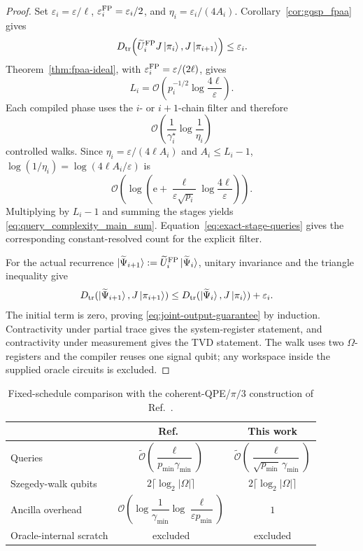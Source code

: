 \documentclass[10pt,conference]{IEEEtran}
\theoremstyle{plain}
\theoremstyle{remark}
\begin{document}
\begin{proof}
Set \(\varepsilon_i=\varepsilon/\ell\),
\(\varepsilon_i^{\rm FP}=\varepsilon_i/2\), and
\(\eta_i=\varepsilon_i/(4A_i)\).
Corollary~\ref{cor:gqsp_fpaa} gives
\[
D_{\rm tr}\!\left(
\widetilde U_i^{\rm FP}J\ket{\pi_i},J\ket{\pi_{i+1}}\right)
\leq\varepsilon_i .
\]
Theorem~\ref{thm:fpaa-ideal}, with
\(\varepsilon_i^{\rm FP}=\varepsilon/(2\ell)\), gives
\[
L_i=\mathcal O\!\left(
p_i^{-1/2}\log\frac{4\ell}{\varepsilon}\right).
\]
Each compiled phase uses the \(i\)- or \(i+1\)-chain filter and
therefore
\[
\mathcal O\!\left(
\frac{1}{\gamma_i^\star}
\log\frac{1}{\eta_i}\right)
\]
controlled walks.  Since \(\eta_i=\varepsilon/(4\ell A_i)\) and
\(A_i\leq L_i-1\), \(\log(1/\eta_i)=\log(4\ell A_i/\varepsilon)\) is
\[
\mathcal O\!\left(\log\!\left(
\mathrm e+\frac{\ell}{\varepsilon\sqrt{p_i}}
\log\frac{4\ell}{\varepsilon}\right)\right).
\]
Multiplying by \(L_i-1\) and
summing the stages yields \eqref{eq:query_complexity_main_sum}.
Equation~\eqref{eq:exact-stage-queries} gives the corresponding
constant-resolved count for the explicit filter.

For the actual recurrence
\(\ket{\widetilde\Psi_{i+1}}
:=\widetilde U_i^{\rm FP}\ket{\widetilde\Psi_i}\), unitary invariance
and the triangle inequality give
\[
\begin{aligned}
D_{\rm tr}(\ket{\widetilde\Psi_{i+1}},J\ket{\pi_{i+1}})
&\leq
D_{\rm tr}(\ket{\widetilde\Psi_i},J\ket{\pi_i})
+\varepsilon_i .
\end{aligned}
\]
The initial term is zero, proving
\eqref{eq:joint-output-guarantee} by induction.  Contractivity under
partial trace gives the system-register statement, and
contractivity under measurement gives the TVD statement.  The walk
uses two \(\Omega\)-registers and the compiler reuses one signal
qubit; any workspace inside the supplied oracle circuits is excluded.
\end{proof}

\FloatBarrier
\begin{table}[!t]
\caption{Fixed-schedule comparison with the coherent-QPE/\(\pi/3\)
construction of Ref.~\cite{wocjan_speed-up_2008}.}
\label{tab:comparison}
\centering
\footnotesize
\renewcommand{\arraystretch}{1.3}
\setlength{\tabcolsep}{3pt}
\begin{tabular}{@{}lcc@{}}
\toprule
& \textbf{Ref.~\cite{wocjan_speed-up_2008}} & \textbf{This work} \\
\midrule
Queries
& $\widetilde{\mathcal{O}}\!\left(\dfrac{\ell}{p_{\min}\gamma_{\min}}\right)$
& $\widetilde{\mathcal{O}}\!\left(\dfrac{\ell}{\sqrt{p_{\min}}\,\gamma_{\min}}\right)$ \\
Szegedy-walk qubits
& \(2\lceil\log_2|\Omega|\rceil\)
& \(2\lceil\log_2|\Omega|\rceil\) \\
Ancilla overhead
& $\mathcal{O}\!\left(\log\dfrac{1}{\gamma_{\min}}\log\dfrac{\ell}{\varepsilon p_{\min}}\right)$
& $1$ \\
Oracle-internal scratch
& excluded & excluded \\
\bottomrule
\end{tabular}
\end{table}
\end{document}
